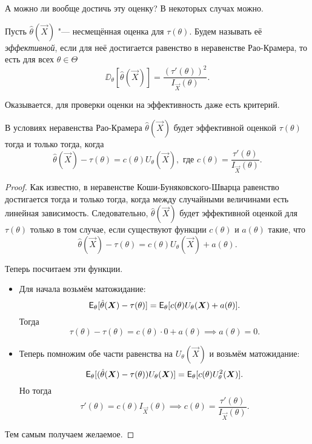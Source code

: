 А можно ли вообще достичь эту оценку? В некоторых случах можно.
\begin{definition}
	Пусть $\hat{\theta}(\vec{X})$ "--- несмещённая оценка для $\tau(\theta)$. Будем называть её \emph{эффективной}, если для неё достигается равенство в неравенстве Рао-Крамера, то есть для всех $\theta \in \Theta$
	\[
		\DD_{\theta}[\hat{\theta}(\vec{X})] = \frac{(\tau'(\theta))^{2}}{I_{\vec{X}}(\theta)}.
	\]
\end{definition}
Оказывается, для проверки оценки на эффективность даже есть критерий.
\begin{theorem}
	В условиях неравенства Рао-Крамера $\hat{\theta}(\vec{X})$ будет эффективной оценкой $\tau(\theta)$ тогда и только тогда, когда 
	\[
		\hat{\theta}(\vec{X}) - \tau(\theta) = c(\theta)U_{\theta}(\vec{X}), \text{ где } c(\theta) = \frac{\tau'(\theta)}{I_{\vec{X}}(\theta)}.
	\]
\end{theorem}
\begin{proof}
	Как известно, в неравенстве Коши-Буняковского-Шварца равенство достигается тогда и только тогда, когда между случайными величинами есть линейная зависимость. Следовательно, $\hat{\theta}(\vec{X})$ будет эффективной оценкой для $\tau(\theta)$ только в том случае, если существуют функции $c(\theta)$ и $a(\theta)$ такие, что
	\[
		\hat{\theta}(\vec{X}) - \tau(\theta) = c(\theta)U_{\theta}(\vec{X}) + a(\theta).
	\]
	
	Теперь посчитаем эти функции.
	\begin{itemize}
		\item Для начала возьмём матожидание:
		\[
			\operatorname{\mathsf{E}}_{\theta}[\hat{\theta}(\bm{X}) - \tau(\theta)] = \operatorname{\mathsf{E}}_{\theta}[c(\theta)U_{\theta}(\bm{X}) + a(\theta)].
		\]
		Тогда
		\[
			\tau(\theta) - \tau(\theta) = c(\theta) \cdot 0 + a(\theta) \implies a(\theta) = 0.
		\]
		
		\item Теперь помножим обе части равенства на $U_{\theta}(\vec{X})$ и возьмём матожидание:
		\[
			\operatorname{\mathsf{E}}_{\theta}[(\hat{\theta}(\bm{X}) - \tau(\theta))U_{\theta}(\bm{X})] = \operatorname{\mathsf{E}}_{\theta}[c(\theta)U_{\theta}^{2}(\bm{X})].
		\]
		Но тогда
		\[
			\tau'(\theta) = c(\theta)I_{\vec{X}}(\theta) \implies c(\theta) = \frac{\tau'(\theta)}{I_{\vec{X}}(\theta)}.
		\]
	\end{itemize}
	Тем самым получаем желаемое.
\end{proof}

